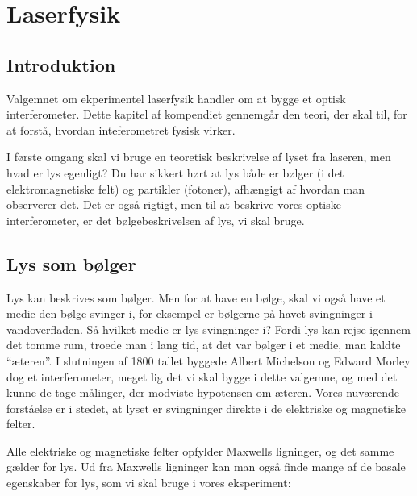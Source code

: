 \documentclass[crop=false, class=memoir]{standalone}
\begin{document}
\chapter{Laserfysik} \label{chap:laser}
\section{Introduktion}
Valgemnet om ekperimentel laserfysik handler om at bygge et optisk interferometer. Dette kapitel af kompendiet gennemgår den teori, der skal til, for at forstå, hvordan inteferometret fysisk virker.

I første omgang skal vi bruge en teoretisk beskrivelse af lyset fra laseren, men hvad er lys egenligt? Du har sikkert hørt at lys både er bølger (i det elektromagnetiske felt) og partikler (fotoner), afhængigt af hvordan man observerer det. Det er også rigtigt, men til at beskrive vores optiske interferometer, er det bølgebeskrivelsen af lys, vi skal bruge.

\section{Lys som bølger}
Lys kan beskrives som bølger. Men for at have en bølge, skal vi også have et medie den bølge svinger i, for eksempel er bølgerne på havet svingninger i vandoverfladen. Så hvilket medie er lys svingninger i? Fordi lys kan rejse igennem det tomme rum, troede man i lang tid, at det var bølger i et medie, man kaldte ``æteren''. I slutningen af 1800 tallet byggede Albert Michelson og Edward Morley dog et interferometer, meget lig det vi skal bygge i dette valgemne, og med det kunne de tage målinger, der modviste hypotensen om æteren. Vores nuværende forståelse er i stedet, at lyset er svingninger direkte i de elektriske og magnetiske felter. 

Alle elektriske og magnetiske felter opfylder Maxwells ligninger, og det samme gælder for lys. Ud fra Maxwells ligninger kan man også finde mange af de basale egenskaber for lys, som vi skal bruge i vores eksperiment:
\end{document}

